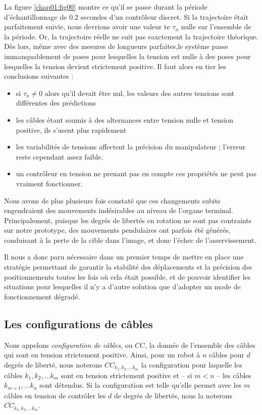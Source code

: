 La figure \ref{chap01:fig00} montre ce qu'il se passe durant la période d'échantillonnage de $0.2$ secondes d'un contrôleur discret. Si la trajectoire était parfaitement suivie, nous devrions avoir une valeur te $\tau_n$ nulle sur l'ensemble de la période. Or, la trajectoire réelle ne suit pas eaxctement la trajectoire théorique. Dès lors, même avec des mesures de longueurs parfaites,le système passe immanquablement de poses pour lesquelles la tension est nulle à des poses pour lesquelles la tension devient strictement positive. Il faut alors en tier les conclusions suivantes :
\begin{itemize}
 \item si $\tau_n \neq 0$ alors qu'il devait être nul, les valeurs des autres tensions sont différentes des prédictions
 \item les câbles étant soumis à des alternances entre tension nulle et tension positive, ils s'usent plus rapidement
 \item les variabilités de tensions affectent la précision du manipulateur ; l'erreur reste cependant assez faible.
 \item un contrôleur en tension ne prenant pas en compte ces propriétés ne peut pas vraiment fonctionner.
\end{itemize}

Nous avons de plus plusieurs fois constat\'e que ces changements subits engendraient des
mouvements ind\'esirables au niveau de l'organe terminal. Principalement,
puisque les degr\'es de libert\'es en rotation ne sont pas contraints sur notre
prototype, des mouvements pendulaires ont parfois \'et\'e g\'en\'er\'es,
conduisant \`a la perte de la cible dans l'image, et donc l'\'echec de
l'asservissement.

Il nous a donc paru n\'ecessaire dans un premier temps de mettre en place une
strat\'egie permettant de garantir la stabilit\'e des d\'eplacements et la
pr\'ecision des positionnements toutes les fois o\`u cela \'etait possible, et
de pouvoir identifier les situations pour lesquelles il n'y a d'autre solution
que d'adopter un mode de fonctionnement d\'egrad\'e.

\subsection{Les configurations de c\^ables}

Nous appelons {\it configuration de c\^ables}, ou $CC$, la donn\'ee de
l'ensemble des c\^ables qui sont en tension strictement positive. Ainsi, pour
un robot \`a $n$ c\^ables pour $d$ degr\'es de libert\'e, nous noterons
$CC_{k_1, k_2, \dots k_m}$ la configuration pour laquelle les c\^ables $k_1,
k_2, \dots k_m$ sont en tension strictement positive et -- si $m < n$ --  les
c\^ables $k_{m+1}, \dots k_n$ sont d\'etendus. Si la configuration est telle
qu'elle permet avec les $m$ c\^ables en tension de contr\^oler les $d$ de
degr\'es de libert\'es, nous la noterons $\overline{CC}_{k_1, k_2, \dots k_m}$.

